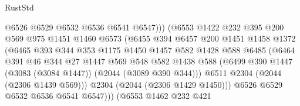 \begin{lexlean}{RustStd}
\begin{coremodule}
{\begin{coremodule}
{{{{{{{{{{{{{{                                  @6526
                                  @6529
                                  @6532
                                  @6536
                                  @6541
                                  @6547)))
                            (@6553
                              @1422
                              @232
                              @395
                              @200
                              @569
                              @975
                              @1451
                              @1460
                              @6573
                              (@6455
                                @394
                                @6457
                                @200
                                @1451
                                @1458
                                @1372
                                (@6465
                                  @393
                                  @344
                                  @353
                                  @1175
                                  @1450
                                  @1457
                                  @582
                                  @1428
                                  @588
                                  @6485
                                  (@6464
                                    @391
                                    @46
                                    @344
                                    @27
                                    @1447
                                    @569
                                    @548
                                    @582
                                    @1438
                                    @588
                                    (@6499
                                      @390
                                      @1447
                                      (@3083 (@3084 @1447))
                                      (@2044 (@3089 @390 @344)))
                                    @6511
                                    @2304
                                    (@2044 (@2306 @1439 @569)))
                                  @2304
                                  (@2044 (@2306 @1429 @1450)))
                                @6526
                                @6529
                                @6532
                                @6536
                                @6541
                                @6547)))
                          (@6553
                            @1462
                            @232
                            @421
}}}}}}}}}}}}}}
\end{coremodule}}
\end{coremodule}
\end{lexlean}

